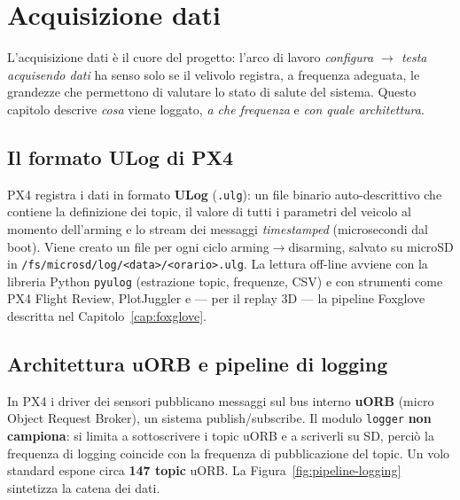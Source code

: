 \chapter{Acquisizione dati}
\label{cap:acquisizione}

L'acquisizione dati \`e il cuore del progetto: l'arco di lavoro
\emph{configura $\rightarrow$ testa acquisendo dati} ha senso solo se il velivolo
registra, a frequenza adeguata, le grandezze che permettono di valutare lo
stato di salute del sistema. Questo capitolo descrive \emph{cosa} viene loggato,
\emph{a che frequenza} e \emph{con quale architettura}.

\section{Il formato ULog di PX4}

PX4 registra i dati in formato \textbf{ULog} (\texttt{.ulg}): un file binario
auto-descrittivo che contiene la definizione dei topic, il valore di tutti i
parametri del veicolo al momento dell'arming e lo stream dei messaggi
\emph{timestamped} (microsecondi dal boot). Viene creato un file per ogni ciclo
arming$\rightarrow$disarming, salvato su microSD in
\texttt{/fs/microsd/log/<data>/<orario>.ulg}. La lettura off-line avviene con la
libreria Python \texttt{pyulog} (estrazione topic, frequenze, CSV) e con
strumenti come PX4 Flight Review, PlotJuggler e --- per il replay 3D --- la
pipeline Foxglove descritta nel Capitolo~\ref{cap:foxglove}.

\section{Architettura uORB e pipeline di logging}

In PX4 i driver dei sensori pubblicano messaggi sul bus interno \textbf{uORB}
(micro Object Request Broker), un sistema publish/subscribe. Il modulo
\texttt{logger} \textbf{non campiona}: si limita a sottoscrivere i topic uORB e a
scriverli su SD, perci\`o la frequenza di logging coincide con la frequenza di
pubblicazione del topic. Un volo standard espone circa \textbf{147 topic} uORB.
La Figura~\ref{fig:pipeline-logging} sintetizza la catena dei dati.


